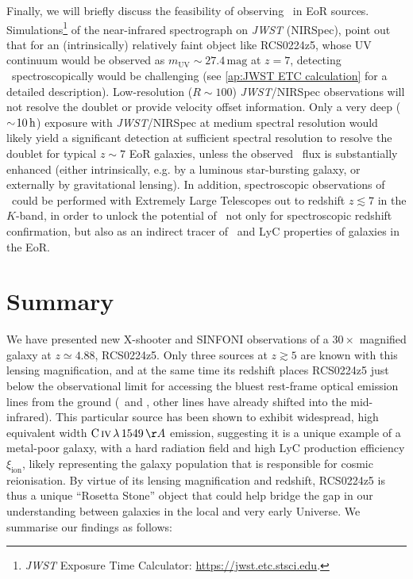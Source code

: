 \noindent Finally, we will briefly discuss the feasibility of observing \MgII\ in EoR sources. Simulations\footnote{\textit{JWST} Exposure Time Calculator: \url{https://jwst.etc.stsci.edu}.} of the near-infrared spectrograph on \textit{JWST} (NIRSpec), point out that for an (intrinsically) relatively faint object like RCS0224z5, whose UV continuum would be observed as $m_\text{UV} \sim 27.4 \, \mathrm{mag}$ at $z = 7$, detecting \MgII\ spectroscopically would be challenging (see \cref{ap:JWST ETC calculation} for a detailed description). Low-resolution ($R \sim 100$) \textit{JWST}/NIRSpec observations will not resolve the doublet or provide velocity offset information. Only a very deep ($\sim \! 10 \, \mathrm{h}$) exposure with \textit{JWST}/NIRSpec at medium spectral resolution would likely yield a significant detection at sufficient spectral resolution to resolve the doublet for typical $z \sim 7$ EoR galaxies, unless the observed \MgII\ flux is substantially enhanced (either intrinsically, e.g. by a luminous star-bursting galaxy, or externally by gravitational lensing). In addition, spectroscopic observations of \MgII\ could be performed with Extremely Large Telescopes out to redshift $z \lesssim 7$ in the $K$-band, in order to unlock the potential of \MgII\ not only for spectroscopic redshift confirmation, but also as an indirect tracer of \lya\ and LyC properties of galaxies in the EoR.

\section{Summary}
\label{sec:Summary}

We have presented new X-shooter and SINFONI observations of a $30 \times$ magnified galaxy at $z \simeq 4.88$, RCS0224z5. Only three sources at $z \gtrsim 5$ are known with this lensing magnification, and at the same time its redshift places RCS0224z5 just below the observational limit for accessing the bluest rest-frame optical emission lines from the ground (\OII\ and \NeIII, other lines have already shifted into the mid-infrared). This particular source has been shown to exhibit widespread, high equivalent width $\CIV \, \lambda \, 1549 \, \Angstrom$ emission, suggesting it is a unique example of a metal-poor galaxy, with a hard radiation field and high LyC production efficiency $\xi_\text{ion}$, likely representing the galaxy population that is responsible for cosmic reionisation. By virtue of its lensing magnification and redshift, RCS0224z5 is thus a unique ``Rosetta Stone'' object that could help bridge the gap in our understanding between galaxies in the local and very early Universe. We summarise our findings as follows:

